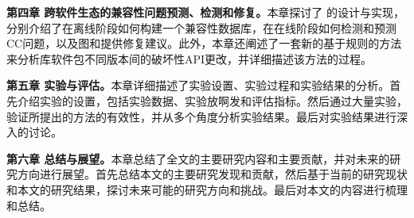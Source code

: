 \textbf{第四章 跨软件生态的兼容性问题预测、检测和修复。}本章探讨了 \tool{}的设计与实现，分别介绍了\tool{}在离线阶段如何构建一个兼容性数据库，在在线阶段如何检测和预测CC问题，以及图和提供修复建议。此外，本章还阐述了一套新的基于规则的方法来分析库软件包不同版本间的破坏性API更改，并详细描述该方法的过程。


\textbf{第五章 实验与评估。}本章详细描述了实验设置、实验过程和实验结果的分析。首先介绍实验的设置，包括实验数据、实验放啊发和评估指标。然后通过大量实验，验证所提出的方法的有效性，并从多个角度分析实验结果。最后对实验结果进行深入的讨论。

\textbf{第六章 总结与展望。}本章总结了全文的主要研究内容和主要贡献，并对未来的研究方向进行展望。首先总结本文的主要研究发现和贡献，然后基于当前的研究现状和本文的研究结果，探讨未来可能的研究方向和挑战。最后对本文的内容进行梳理和总结。


